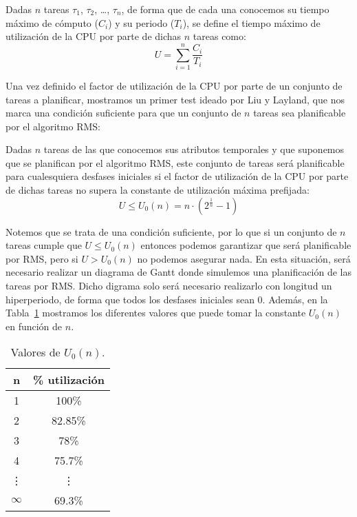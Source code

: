 \begin{definicion}
    Dadas $n$ tareas $\tau_1$, $\tau_2$, \ldots, $\tau_n$, de forma que de cada una conocemos su tiempo máximo de cómputo ($C_i$) y su periodo ($T_i$), se define el tiempo máximo de utilización de la CPU por parte de dichas $n$ tareas como:
    \begin{equation*}
        U = \sum_{i=1}^{n} \dfrac{C_i}{T_i}
    \end{equation*}
\end{definicion}
Una vez definido el factor de utilización de la CPU por parte de un conjunto de tareas a planificar, mostramos un primer test ideado por Liu y Layland, que nos marca una condición suficiente para que un conjunto de $n$ tareas sea planificable por el algoritmo RMS:
\begin{teo}
    Dadas $n$ tareas de las que conocemos sus atributos temporales y que suponemos que se planifican por el algoritmo RMS, este conjunto de tareas será planificable para cualesquiera desfases iniciales si el factor de utilización de la CPU por parte de dichas tareas no supera la constante de utilización máxima prefijada:
    \begin{equation*}
        U \leq U_0(n) = n\cdot \left(2^{\frac{1}{n}} - 1\right)
    \end{equation*}
\end{teo}
Notemos que se trata de una condición suficiente, por lo que si un conjunto de $n$ tareas cumple que $U\leq U_0(n)$ entonces podemos garantizar que será planificable por RMS, pero si $U>U_0(n)$ no podemos asegurar nada. En esta situación, será necesario realizar un diagrama de Gantt donde simulemos una planificación de las tareas por RMS\@. Dicho digrama solo será necesario realizarlo con longitud un hiperperiodo, de forma que todos los desfases iniciales sean 0. Además, en la Tabla~\ref{tab:u0n} mostramos los diferentes valores que puede tomar la constante $U_0(n)$ en función de $n$.
\begin{table}[H]
\centering
\begin{tabular}{|c|c|}
    \hline
    n & \% utilización \\
    \hline
    1 & 100\% \\
    2 & 82.85\% \\
    3 & 78\% \\
    4 & 75.7\% \\
    \vdots & \vdots \\
    $\infty$ & 69.3\% \\
    \hline
\end{tabular}
\caption{Valores de $U_0(n)$.}
\label{tab:u0n}
\end{table}


